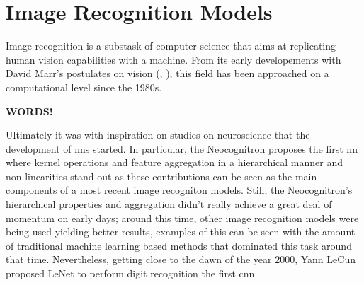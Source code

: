 \section{Image Recognition Models}
\label{rel:sec_imrecon}
Image recognition is a substask of computer science that aims at replicating human vision 
capabilities with a machine. From its early developements  with David Marr's postulates 
on vision (\cite{poggio1981marr}, \cite{marr2010vision}), this field has been approached on a 
computational level since the 1980s. 

\textbf{WORDS!}

%


Ultimately it was with inspiration on studies on neuroscience \autocite{hubel1959receptive} that the 
development of \glspl{nn} started. In particular, the Neocognitron \autocite{fukushima1975cognitron} 
proposes the first \gls{nn} where kernel operations and feature aggregation in a hierarchical 
manner and non-linearities stand out as these contributions can be seen as the main components of a 
most recent image recogniton models.
Still, the Neocognitron's hierarchical properties and aggregation didn't really achieve 
a great deal of momentum on early days; around this time, other image recognition models were being 
used yielding better results, examples of this can be seen with the amount of traditional machine 
learning based methods that dominated this task around that time. Nevertheless, getting close to the 
dawn of the year 2000, Yann LeCun proposed LeNet to perform digit recognition 
\autocite{lecun1998gradient} the first \gls{cnn}.\\


